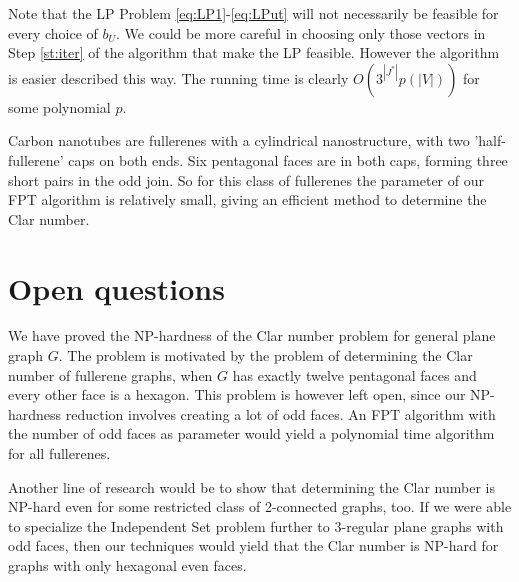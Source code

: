 \documentclass{article}
\begin{document}
Note that the  LP Problem \eqref{eq:LP1}-\eqref{eq:LPut} will not necessarily be feasible for every choice of $b_U$. We could be more careful in choosing only those vectors in Step \ref{st:iter} of the algorithm that make the LP feasible. However the algorithm is easier described this way. The running time is clearly $O(3^{|J^*|}p(|V|))$ for some polynomial $p$.

Carbon nanotubes are fullerenes with a cylindrical nanostructure, with two 'half-fullerene' caps on both ends. Six pentagonal faces are in both caps, forming three short pairs in the odd join. So for this class of fullerenes the parameter of our FPT algorithm is relatively small, giving an efficient method to determine the Clar number.

\section{Open questions}
We have proved the NP-hardness of the Clar number problem for general plane
graph $G$.  The problem is motivated by the problem of determining the Clar number of fullerene graphs, when  $G$ has exactly
twelve pentagonal faces and every other face is a hexagon. This problem is
however left open, since our NP-hardness
reduction involves creating a lot of odd faces. An FPT algorithm with the number of odd faces as parameter would yield a polynomial time algorithm for all fullerenes.

Another line of research would be to show that determining the Clar
number is NP-hard even for some restricted class of 2-connected
graphs, too. If we were able to specialize the Independent Set problem
further to $3$-regular plane graphs with odd faces, then our
techniques would yield that the Clar number is NP-hard for graphs
with only hexagonal even faces.



\end{document}
